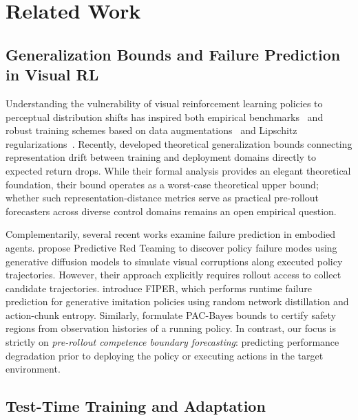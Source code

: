 \section{Related Work}
\label{sec:related_work}

\subsection{Generalization Bounds and Failure Prediction in Visual RL}

Understanding the vulnerability of visual reinforcement learning policies to perceptual distribution shifts has inspired both empirical benchmarks~\citep{cobbe2020procgen} and robust training schemes based on data augmentations~\citep{yarats2021drqv2,hansen2021svea} and Lipschitz regularizations~\citep{yuan2022tlda}.
Recently, \citet{lyu2024generalization} developed theoretical generalization bounds connecting representation drift between training and deployment domains directly to expected return drops.
While their formal analysis provides an elegant theoretical foundation, their bound operates as a worst-case theoretical upper bound; whether such representation-distance metrics serve as practical pre-rollout forecasters across diverse control domains remains an open empirical question.

Complementarily, several recent works examine failure prediction in embodied agents. 
\citet{majumdar2025predictive} propose Predictive Red Teaming to discover policy failure modes using generative diffusion models to simulate visual corruptions along executed policy trajectories. 
However, their approach explicitly requires rollout access to collect candidate trajectories.
\citet{romer2025fiper} introduce FIPER, which performs runtime failure prediction for generative imitation policies using random network distillation and action-chunk entropy.
Similarly, \citet{farid2022failure} formulate PAC-Bayes bounds to certify safety regions from observation histories of a running policy.
In contrast, our focus is strictly on \emph{pre-rollout competence boundary forecasting}: predicting performance degradation prior to deploying the policy or executing actions in the target environment.

\subsection{Test-Time Training and Adaptation}

